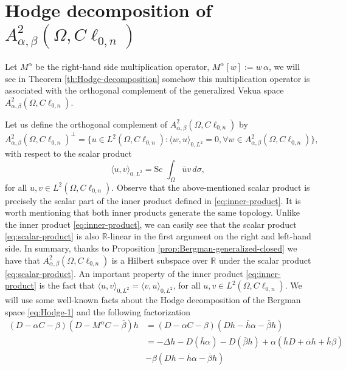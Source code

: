 \documentclass[12pt]{article}
\def\div{\mbox{div}\,}
\def\grad{\mbox{grad}\,}
\begin{document}
\section{Hodge decomposition of $A_{\alpha,\beta}^2(\Omega,C\ell_{0,n})$}\label{sec:Hodge}
Let $M^{\alpha}$ be the right-hand side multiplication operator, $M^{\alpha}[w]:=w\, \alpha$, we will see in Theorem \ref{th:Hodge-decomposition} somehow this multiplication operator is associated with the orthogonal complement of the generalized Vekua space $A_{\alpha,\beta}^2(\Omega, C\ell_{0,n})$.

Let us define the orthogonal complement of $A_{\alpha,\beta}^2(\Omega,C\ell_{0,n})$ by
\[
A_{\alpha,\beta}^2(\Omega,C\ell_{0,n})^{\bot}=\{u\in L^2(\Omega,C\ell_{0,n}) \colon \langle w, u\rangle_{0,L^2}=0, \forall w\in A_{\alpha,\beta}^2(\Omega,C\ell_{0,n})\},
\]
with respect to the scalar product
\begin{equation}\label{eq:scalar-product}
   \langle u,v\rangle_{0,L^2}=\text{Sc }\int_{\Omega} \overline{u}v\, d\sigma, 
\end{equation}
for all $u, v\in L^2(\Omega,C\ell_{0,n})$. Observe that the above-mentioned scalar product is precisely the scalar part of the inner product defined in \eqref{eq:inner-product}. It is worth mentioning that both inner products generate the same topology. 
Unlike the inner product \eqref{eq:inner-product}, we can easily see that the scalar product \eqref{eq:scalar-product} is also $\mathbb{R}$-linear in the first argument on the right and left-hand side.
In summary, thanks to Proposition \ref{prop:Bergman-generalized-closed} we have that $A_{\alpha,\beta}^2(\Omega,C\ell_{0,n})$ is a Hilbert subspace over $\mathbb{R}$ under the scalar product \eqref{eq:scalar-product}.
An important property of the inner product \eqref{eq:inner-product} is the fact that $\langle u, v\rangle_{0,L^2}=\langle v, u\rangle_{0,L^2}$, for all $u,v\in L^2(\Omega,C\ell_{0,n})$.
We will use some well-known facts about the Hodge decomposition of the Bergman space \eqref{eq:Hodge-1} and the following factorization 
\begin{align}\label{eq:factorization-complete}
   \nonumber (D-\alpha C-\beta)(D-M^{\alpha}C-\overline{\beta})h&=(D-\alpha C-\beta)(Dh-\overline{h}\alpha -\overline{\beta} h)\\
   \nonumber  &=-\Delta h-D( \overline{h}\alpha)-D(\overline{\beta} h)+\alpha(\overline{h}D+\overline{\alpha}h+\overline{h}\beta)\\
   &-\beta (Dh-\overline{h}\alpha - \overline{\beta}h )  
\end{align}
\end{document}
